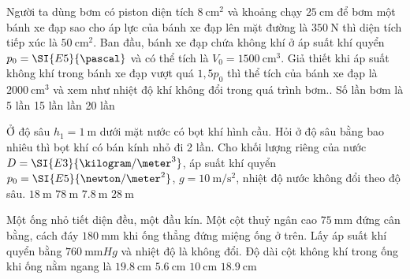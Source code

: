 \begin{ex}
Người ta dùng bơm có piston diện tích $\SI{8}{\centi\meter^2}$ và khoảng chạy $\SI{25}{\centi\meter}$ để bơm một bánh xe đạp sao cho áp lực của bánh xe đạp lên mặt đường là $\SI{350}{\newton}$ thì diện tích tiếp xúc là $\SI{50}{\centi\meter^2}$. Ban đầu, bánh xe đạp chứa không khí ở áp suất khí quyển $p_0=\SI{E5}{\pascal}$ và có thể tích là $V_0=\SI{1500}{\centi\meter^3}$. Giả thiết khi áp suất không khí trong bánh xe đạp vượt quá $1,5p_0$ thì thể tích của bánh xe đạp là $\SI{2000}{\centi\meter^3}$ và xem như nhiệt độ khí không đổi trong quá trình bơm.. Số lần bơm là	
	\choice
	{5 lần}
	{15 lần}
	{ lần}
	{20 lần}
\end{ex}
\begin{ex}
Ở độ sâu $h_1=\SI{1}{\meter}$ dưới mặt nước có bọt khí hình cầu. Hỏi ở độ sâu bằng bao nhiêu thì bọt khí có bán kính nhỏ đi 2 lần. Cho khối lượng riêng của nước $D=\SI{E3}{\kilogram/\meter^3}$, áp suất khí quyển $p_0=\SI{E5}{\newton/\meter^2}$, $g=\SI{10}{\meter/\second^2}$, nhiệt độ nước không đổi theo độ sâu.	
	\choice
	{$\SI{18}{\meter}$}
	{\True $\SI{78}{\meter}$}
	{$\SI{7.8}{\meter}$}
	{$\SI{28}{\meter}$}
\end{ex}
\begin{ex}
Một ống nhỏ tiết diện đều, một đầu kín. Một cột thuỷ ngân cao $\SI{75}{\milli\meter}$ đứng cân bằng, cách đáy $\SI{180}{\milli\meter}$ khi ống thẳng đứng miệng ống ở trên. Lấy áp suất khí quyển bằng $\SI{760}{\milli\meter Hg}$ và nhiệt độ là không đổi. Độ dài cột không khí trong ống khi ống nằm ngang là	
	\choice
	{\True $\SI{19.8}{\centi\meter}$}
	{$\SI{5.6}{\centi\meter}$}
	{$\SI{10}{\centi\meter}$}
	{$\SI{18.9}{\centi\meter}$}
\end{ex}
